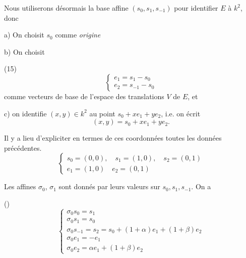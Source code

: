 \documentclass[11pt,a4paper]{article}
\begin{document}

Nous utiliserons désormais la base affine $(s_0, s_1, s_{-1})$ pour identifier $E$ à $k^2$, donc

a) On choisit $s_0$ comme \emph{origine}

b) On choisit

(15)
\[
\begin{cases}
e_1 = s_1 - s_0 \\
e_2 = s_{-1} - s_0
\end{cases}
\]
comme vecteurs de base de l'espace des translations $V$ de $E$, et

c) on identifie $(x,y) \in k^2$ au point $s_0 + x e_1 + y e_2$, i.e. on écrit
\[
(x,y) = s_0 + x e_1 + y e_2 .
\]

Il y a lieu d'expliciter en termes de ces coordonnées toutes les données précédentes.
\[
\begin{cases}
s_0 = (0,0), \quad s_1 = (1,0), \quad s_2 = (0,1) \\
e_1 = (1,0) \quad e_2 = (0,1)
\end{cases}
\]

Les  affines $\sigma_0$, $\sigma_1$ sont donnés par leurs valeurs sur $s_0, s_1, s_{-1}$. On a

()
\[
\begin{cases}
\sigma_0 s_0 = s_1 \\
\sigma_0 s_1 = s_0 \\
\sigma_0 s_{-1} = s_2 = s_0 + (1+\alpha) e_1 + (1+\beta) e_2 \\
\sigma_0 e_1 = -e_1 \\
\sigma_0 e_2 = \alpha e_1 + (1+\beta) e_2
\end{cases}
\]

\end{document}
